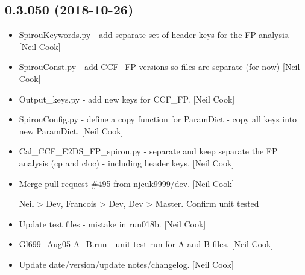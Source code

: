 \documentclass[a4paper,10pt,english]{report}
\begin{document}
\subsection{0.3.050 (2018-10-26)}
\label{\detokenize{misc/changelog:id280}}\begin{itemize}
\item {} 
SpirouKeywords.py - add separate set of header keys for the FP
analysis. {[}Neil Cook{]}

\item {} 
SpirouConst.py - add CCF\_FP versions so files are separate (for now)
{[}Neil Cook{]}

\item {} 
Output\_keys.py - add new keys for CCF\_FP. {[}Neil Cook{]}

\item {} 
SpirouConfig.py - define a copy function for ParamDict - copy all keys
into new ParamDict. {[}Neil Cook{]}

\item {} 
Cal\_CCF\_E2DS\_FP\_spirou.py - separate and keep separate the FP analysis
(cp and cloc) - including header keys. {[}Neil Cook{]}

\item {} 
Merge pull request \#495 from njcuk9999/dev. {[}Neil Cook{]}

Neil \textendash{}\textgreater{} Dev, Francois \textendash{}\textgreater{} Dev, Dev \textendash{}\textgreater{} Master. Confirm unit tested

\item {} 
Update test files - mistake in run018b. {[}Neil Cook{]}

\item {} 
Gl699\_Aug05-A\_B.run - unit test run for A and B files. {[}Neil Cook{]}

\item {} 
Update date/version/update notes/changelog. {[}Neil Cook{]}

\end{itemize}
\end{document}
